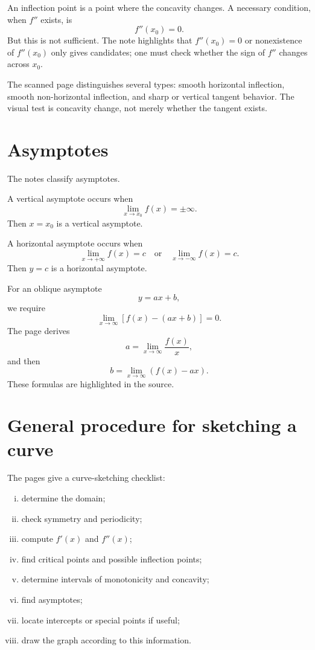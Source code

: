 An inflection point is a point where the concavity changes.  A necessary condition, when $f''$ exists, is
\[
  f''(x_0)=0.
\]
But this is not sufficient.  The note highlights that $f''(x_0)=0$ or nonexistence of $f''(x_0)$ only gives candidates; one must check whether the sign of $f''$ changes across $x_0$.

The scanned page distinguishes several types: smooth horizontal inflection, smooth non-horizontal inflection, and sharp or vertical tangent behavior.  The visual test is concavity change, not merely whether the tangent exists.

\section{Asymptotes}

The notes classify asymptotes.

A vertical asymptote occurs when
\[
  \lim_{x\to x_0}f(x)=\pm\infty.
\]
Then $x=x_0$ is a vertical asymptote.

A horizontal asymptote occurs when
\[
  \lim_{x\to+\infty}f(x)=c
  \quad\text{or}\quad
  \lim_{x\to-\infty}f(x)=c.
\]
Then $y=c$ is a horizontal asymptote.

For an oblique asymptote
\[
  y=ax+b,
\]
we require
\[
  \lim_{x\to\infty}[f(x)-(ax+b)]=0.
\]
The page derives
\[
  a=\lim_{x\to\infty}
\frac{f(x)}x,
\]
and then
\[
  b=\lim_{x\to\infty}(f(x)-ax).
\]
These formulas are highlighted in the source.

\section{General procedure for sketching a curve}

The pages give a curve-sketching checklist:

\begin{enumerate}[(i)]
  \item determine the domain;
  \item check symmetry and periodicity;
  \item compute $f'(x)$ and $f''(x)$;
  \item find critical points and possible inflection points;
  \item determine intervals of monotonicity and concavity;
  \item find asymptotes;
  \item locate intercepts or special points if useful;
  \item draw the graph according to this information.
\end{enumerate}

